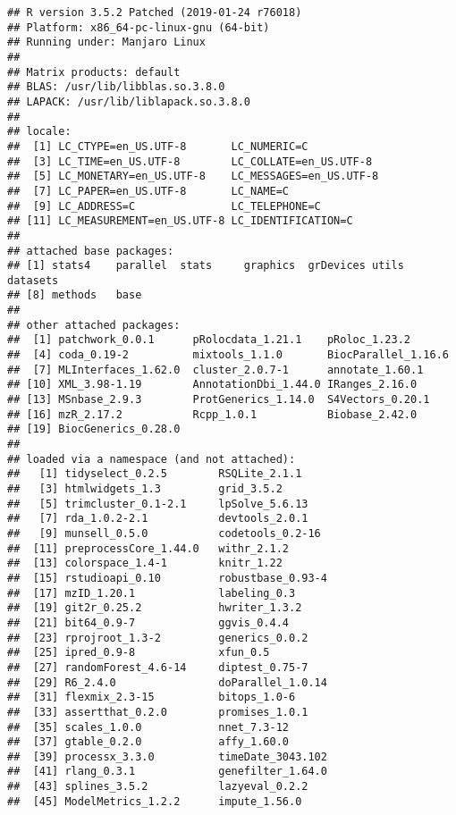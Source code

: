 \documentclass[9pt,a4paper,]{extarticle}
\begin{document}
\begin{verbatim}
## R version 3.5.2 Patched (2019-01-24 r76018)
## Platform: x86_64-pc-linux-gnu (64-bit)
## Running under: Manjaro Linux
## 
## Matrix products: default
## BLAS: /usr/lib/libblas.so.3.8.0
## LAPACK: /usr/lib/liblapack.so.3.8.0
## 
## locale:
##  [1] LC_CTYPE=en_US.UTF-8       LC_NUMERIC=C              
##  [3] LC_TIME=en_US.UTF-8        LC_COLLATE=en_US.UTF-8    
##  [5] LC_MONETARY=en_US.UTF-8    LC_MESSAGES=en_US.UTF-8   
##  [7] LC_PAPER=en_US.UTF-8       LC_NAME=C                 
##  [9] LC_ADDRESS=C               LC_TELEPHONE=C            
## [11] LC_MEASUREMENT=en_US.UTF-8 LC_IDENTIFICATION=C       
## 
## attached base packages:
## [1] stats4    parallel  stats     graphics  grDevices utils     datasets 
## [8] methods   base     
## 
## other attached packages:
##  [1] patchwork_0.0.1      pRolocdata_1.21.1    pRoloc_1.23.2       
##  [4] coda_0.19-2          mixtools_1.1.0       BiocParallel_1.16.6 
##  [7] MLInterfaces_1.62.0  cluster_2.0.7-1      annotate_1.60.1     
## [10] XML_3.98-1.19        AnnotationDbi_1.44.0 IRanges_2.16.0      
## [13] MSnbase_2.9.3        ProtGenerics_1.14.0  S4Vectors_0.20.1    
## [16] mzR_2.17.2           Rcpp_1.0.1           Biobase_2.42.0      
## [19] BiocGenerics_0.28.0 
## 
## loaded via a namespace (and not attached):
##   [1] tidyselect_0.2.5        RSQLite_2.1.1          
##   [3] htmlwidgets_1.3         grid_3.5.2             
##   [5] trimcluster_0.1-2.1     lpSolve_5.6.13         
##   [7] rda_1.0.2-2.1           devtools_2.0.1         
##   [9] munsell_0.5.0           codetools_0.2-16       
##  [11] preprocessCore_1.44.0   withr_2.1.2            
##  [13] colorspace_1.4-1        knitr_1.22             
##  [15] rstudioapi_0.10         robustbase_0.93-4      
##  [17] mzID_1.20.1             labeling_0.3           
##  [19] git2r_0.25.2            hwriter_1.3.2          
##  [21] bit64_0.9-7             ggvis_0.4.4            
##  [23] rprojroot_1.3-2         generics_0.0.2         
##  [25] ipred_0.9-8             xfun_0.5               
##  [27] randomForest_4.6-14     diptest_0.75-7         
##  [29] R6_2.4.0                doParallel_1.0.14      
##  [31] flexmix_2.3-15          bitops_1.0-6           
##  [33] assertthat_0.2.0        promises_1.0.1         
##  [35] scales_1.0.0            nnet_7.3-12            
##  [37] gtable_0.2.0            affy_1.60.0            
##  [39] processx_3.3.0          timeDate_3043.102      
##  [41] rlang_0.3.1             genefilter_1.64.0      
##  [43] splines_3.5.2           lazyeval_0.2.2         
##  [45] ModelMetrics_1.2.2      impute_1.56.0          

\end{verbatim}
\end{document}
